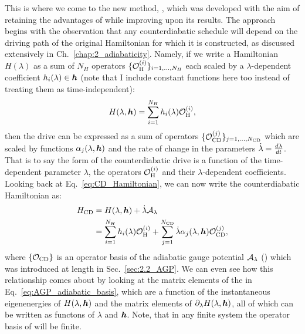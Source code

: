 This is where we come to the new method, , which was developed with the aim of retaining the advantages of  while improving upon its results. The approach begins with the observation that any counterdiabatic schedule will depend on the driving path of the original Hamiltonian for which it is constructed, as discussed extensively in Ch.~\ref{chap:2_adiabaticity}. Namely, if we write a Hamiltonian $H(\lambda)$ as a sum of $N_H$ operators $\{ \mathcal{O}_{\rm H}^{(i)} \}_{i = 1,...,N_H}$ each scaled by a $\lambda$-dependent coefficient $h_i(\lambda) \in \boldsymbol{h}$ (note that I include constant functions here too instead of treating them as time-independent):
\begin{equation}
    H(\lambda, \boldsymbol{h}) = \sum_{i = 1}^{N_H} h_i(\lambda) \mathcal{O}_{\rm H}^{(i)},
\end{equation}
then the  drive can be expressed as a sum of operators $\{\mathcal{O}_{\rm CD}^{(j)}\}_{j = 1,...,N_{\rm CD}}$ which are scaled by functions $\alpha_{j}(\lambda, \boldsymbol{h})$ and the rate of change in the parameters $\dot{\lambda} = \frac{d \lambda}{dt}$. That is to say the form of the counterdiabatic drive is a function of the time-dependent parameter $\lambda$, the operators $\mathcal{O}_{\rm H}^{(i)}$ and their $\lambda$-dependent coefficients. Looking back at Eq.~\eqref{eq:CD_Hamiltonian}, we can now write the counterdiabatic Hamiltonian as:
\begin{equation}\label{eq:H_cd_operators}
    \begin{aligned}
        H_{\rm CD} &= H(\lambda, \boldsymbol{h}) + \dot{\lambda} \mathcal{A}_{\lambda} \\
        &= \sum_{i = 1}^{N_H} h_i(\lambda) \mathcal{O}_{\rm H}^{(i)} + \sum_{j = 1}^{N_{\rm CD}} \dot{\lambda} \alpha_{j}(\lambda, \boldsymbol{h}) \mathcal{O}_{\rm CD}^{(j)},
    \end{aligned}
\end{equation}
where $\{\mathcal{O}_{\rm CD}\}$ is an operator basis of the adiabatic gauge potential $\mathcal{A}_{\lambda}$ () which was introduced at length in Sec.~\ref{sec:2.2_AGP}. We can even see how this relationship comes about by looking at the matrix elements of the  in Eq.~\eqref{eq:AGP_adiabatic_basis}, which are a function of the instantaneous eigenenergies of $H(\lambda, \boldsymbol{h})$ and the matrix elements of $\partial_{\lambda} H(\lambda, \boldsymbol{h})$, all of which can be written as functons of $\lambda$ and $\boldsymbol{h}$. Note, that in any finite system the operator basis of  will be finite.

